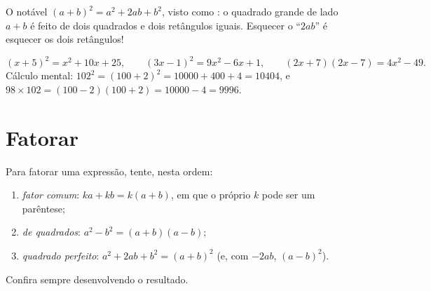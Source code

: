 \begin{omfigure}

{\small O  notável $(a+b)^2 = a^2 + 2ab + b^2$, visto como
: o quadrado grande de lado $a+b$ é feito de dois quadrados e dois
retângulos iguais. Esquecer o ``$2ab$'' é esquecer os dois retângulos!}
\end{omfigure}

\begin{example}\label{ex:g9:algebra:identities}
\[
(x + 5)^2 = x^2 + 10x + 25, \qquad
(3x - 1)^2 = 9x^2 - 6x + 1, \qquad
(2x + 7)(2x - 7) = 4x^2 - 49 .
\]
Cálculo mental: $102^2 = (100 + 2)^2 = 10000 + 400 + 4 = 10404$, e
$98 \times 102 = (100-2)(100+2) = 10000 - 4 = 9996$.
\end{example}

\section{Fatorar}

\begin{method}[Fatorar]\label{met:g9:algebra:factor}
Para fatorar uma expressão, tente, nesta ordem:
\begin{enumerate}
  \item \emph{fator comum}: $ka + kb = k(a + b)$, em que o próprio $k$
        pode ser um parêntese;
  \item \emph{ de quadrados}: $a^2 - b^2 = (a+b)(a-b)$;
  \item \emph{quadrado perfeito}: $a^2 + 2ab + b^2 = (a+b)^2$ (e, com
        $-2ab$, $(a-b)^2$).
\end{enumerate}
Confira sempre desenvolvendo o resultado.
\end{method}

